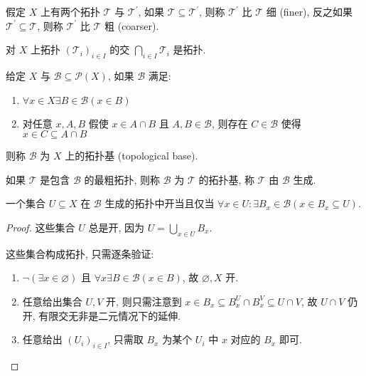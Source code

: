 \begin{definition}
    假定 \(X\) 上有两个拓扑 \(\mathcal{T}\) 与 \(\mathcal{T}^\prime\), 如果 \(\mathcal{T} \subseteq \mathcal{T}^\prime\), 则称 \(\mathcal{T}^\prime\) 比 \(\mathcal{T}\) 细 (finer),
    反之如果 \(\mathcal{T}^\prime \subseteq \mathcal{T}\), 则称 \(\mathcal{T}^\prime\) 比 \(\mathcal{T}\) 粗 (coarser).
\end{definition}

\begin{lemma}
    对 \(X\) 上拓扑 \({(\mathcal{T}_i)}_{i \in I}\) 的交 \(\bigcap_{i \in I} \mathcal{T}_i\) 是拓扑.
\end{lemma}

\begin{definition}[拓扑基]
    给定 \(X\) 与 \(\mathcal{B} \subseteq \mathcal{P}(X)\), 如果 \(\mathcal{B}\) 满足:
    \begin{enumerate}
        \item \(\forall x \in X \exists B \in \mathcal{B} (x \in B)\)
        \item 对任意 \(x,A,B\) 假使 \(x \in A \cap B\) 且 \(A,B \in \mathcal{B}\), 则存在 \(C \in \mathcal{B}\) 使得 \(x \in C \subseteq A \cap B\)
    \end{enumerate}
    则称 \(\mathcal{B}\) 为 \(X\) 上的拓扑基 (topological base).
\end{definition}

\begin{definition}
    如果 \(\mathcal{T}\) 是包含 \(\mathcal{B}\) 的最粗拓扑, 则称 \(\mathcal{B}\) 为 \(\mathcal{T}\) 的拓扑基, 称 \(\mathcal{T}\) 由 \(\mathcal{B}\) 生成.
\end{definition}

\begin{lemma}
    \label {lemma:topology generated by base}
    一个集合 \(U \subseteq X\) 在 \(\mathcal{B}\) 生成的拓扑中开当且仅当 \(\forall x \in U : \exists B_x \in \mathcal{B} (x \in B_x \subseteq U)\).

    \begin{proof}
        这些集合 \(U\) 总是开, 因为 \(U = \bigcup_{x \in U} B_x\).

        这些集合构成拓扑, 只需逐条验证:
        \begin{enumerate}
            \item \(\neg (\exists x \in \varnothing)\) 且 \(\forall x \exists B \in \mathcal{B} (x \in B)\), 故 \(\varnothing, X\) 开.
            \item 任意给出集合 \(U,V\) 开, 则只需注意到 \(x \in B_x \subseteq B_x^U \cap B_x^V \subseteq U \cap V\), 故 \(U \cap V\) 仍开, 有限交无非是二元情况下的延伸.
            \item 任意给出 \({(U_i)}_{i \in I}\), 只需取 \(B_x\) 为某个 \(U_i\) 中 \(x\) 对应的 \(B_x\) 即可.
        \end{enumerate}
    \end{proof}
\end{lemma}

